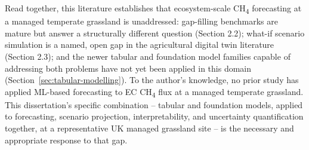 Read together, this literature establishes that ecosystem-scale CH\textsubscript{4} forecasting at
a managed temperate grassland is unaddressed: gap-filling benchmarks are mature but answer a
structurally different question (Section 2.2); what-if scenario simulation is a named, open gap in
the agricultural digital twin literature (Section 2.3); and the newer tabular and foundation model
families capable of addressing both problems have not yet been applied in this domain
(Section~\ref{sec:tabular-modelling}). To the author's knowledge, no prior study has applied
ML-based forecasting to EC CH\textsubscript{4} flux at a managed temperate grassland. This
dissertation's specific combination -- tabular and foundation models, applied to forecasting,
scenario projection, interpretability, and uncertainty quantification together, at a representative
UK managed grassland site -- is the necessary and appropriate response to that gap.
